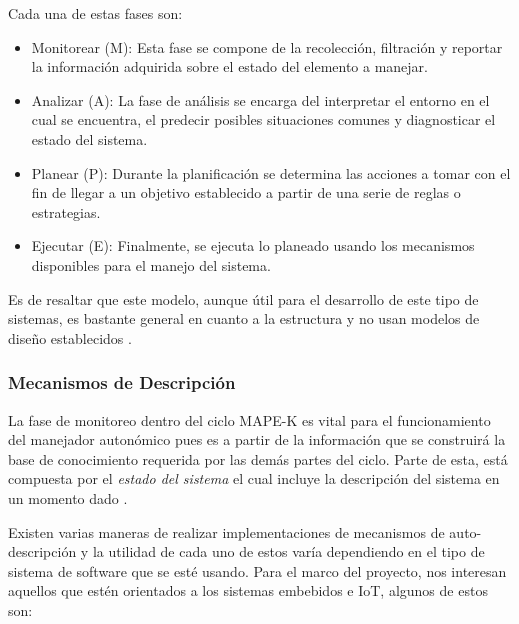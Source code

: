 Cada una de estas fases son:

\begin{itemize}
    \item Monitorear (M): Esta fase se compone de la recolección, filtración y reportar la información adquirida sobre el estado del elemento a manejar.
    \item Analizar (A): La fase de análisis se encarga del interpretar el entorno en el cual se encuentra, el predecir posibles situaciones comunes y diagnosticar el estado del sistema.
    \item Planear (P): Durante la planificación se determina las acciones a tomar con el fin de llegar a un objetivo establecido a partir de una serie de reglas o estrategias.
    \item Ejecutar (E): Finalmente, se ejecuta lo planeado usando los mecanismos disponibles para el manejo del sistema. 
\end{itemize}

Es de resaltar que este modelo, aunque útil para el desarrollo de este tipo de sistemas, es bastante general en cuanto a la estructura y no usan modelos de diseño establecidos \cite{Ouareth_2018}. 

\subsubsection{Mecanismos de Descripción}


La fase de monitoreo dentro del ciclo MAPE-K es vital para el funcionamiento del manejador autonómico pues es a partir de la información que se construirá la base de conocimiento requerida por las demás partes del ciclo. Parte de esta, está compuesta por el \textit{estado del sistema} el cual incluye la descripción del sistema en un momento dado \cite{Weiss_2011}.

Existen varias maneras de realizar implementaciones de mecanismos de auto-descripción y la utilidad de cada uno de estos varía dependiendo en el tipo de sistema de software que se esté usando. Para el marco del proyecto, nos interesan aquellos que estén orientados a los sistemas embebidos e  IoT, algunos de estos son:

